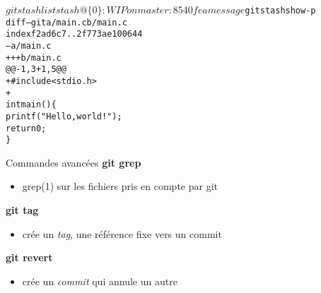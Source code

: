 \begin{frame}[fragile]{}
\end{frame}

\begin{frame}[fragile]{}
\begin{alltt}
$ git stash list
stash@\{0\}: WIP on master: 8540fea message

$ git stash show -p
\textcolor{ansired}{diff –git a/main.c b/main.c
index f2ad6c7..2f773ae 100644
--- a/main.c
+++ b/main.c}
\textcolor{ansicyan}{@@ -1,3 +1,5 @@}
\textcolor{ansigreen}{+#include <stdio.h>
+}
 int main() \{
    printf("Hello, world!");
    return 0;
 \}
\end{alltt}
\end{frame}

\begin{frame}{Commandes avancées}
  \textbf{git grep}
  \begin{itemize}
    \item grep(1) sur les fichiers pris en compte par git
  \end{itemize}

  \bigskip
  \textbf{git tag}
  \begin{itemize}
    \item crée un \emph{tag}, une référence fixe vers un commit
  \end{itemize}

  \bigskip
  \textbf{git revert}
  \begin{itemize}
    \item crée un \emph{commit} qui annule un autre
  \end{itemize}
\end{frame}

